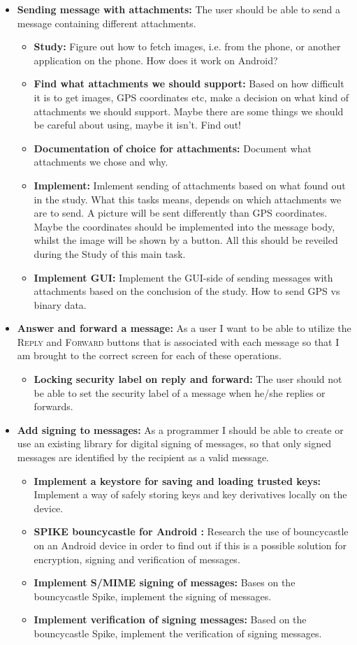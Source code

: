 \begin{itemize}
\item{}\textbf{Sending message with attachments:} The user should be able to send a message containing different attachments.
\begin{itemize}
\item{}\textbf{Study:} Figure out how to fetch images, i.e. from the phone, or another application on the phone. How does it work on Android?
\item{}\textbf{Find what attachments we should support:} Based on how difficult it is to get images, GPS coordinates etc, make a decision on what kind of attachments we should support. Maybe there are some things we should be careful about using, maybe it isn't. Find out!
\item{}\textbf{Documentation of choice for attachments:} Document what attachments we chose and why.
\item{}\textbf{Implement:} Imlement sending of attachments based on what found out in the study. What this tasks means, depends on which attachments we are to send. A picture will be sent differently than GPS coordinates. Maybe the coordinates should be implemented into the message body, whilst the image will be shown by a button. All this should be reveiled during the Study of this main task. 
\item{}\textbf{Implement GUI:} Implement the GUI-side of sending messages with attachments based on the conclusion of the study. How to send GPS vs binary data.
\end{itemize}
\item{}\textbf{Answer and forward a message:} As a user I want to be able to utilize the \textsc{Reply} and \textsc{Forward} buttons that is associated with each message so that I am brought to the correct screen for each of these operations.
\begin{itemize}
\item{}\textbf{Locking security label on reply and forward:} The user should not be able to set the security label of a message when he/she replies or forwards.
\end{itemize}
\item{}\textbf{Add signing to messages:} As a programmer I should be able to create or use an existing library for digital signing of messages, so that only signed messages are identified by the recipient as a valid message.
\begin{itemize}
\item{}\textbf{Implement a keystore for saving and loading trusted keys:} Implement a way of safely storing keys and key derivatives locally on the device. 
\item{}\textbf{SPIKE bouncycastle for Android :} Research the use of bouncycastle on an Android device in order to find out if this is a possible solution for encryption, signing and verification of messages.
\item{}\textbf{Implement S/MIME signing of messages:} Bases on the bouncycastle Spike, implement the signing of messages. 
\item{}\textbf{Implement verification of signing messages:} Based on the bouncycastle Spike, implement the verification of signing messages.
\end{itemize}


\end{itemize}
